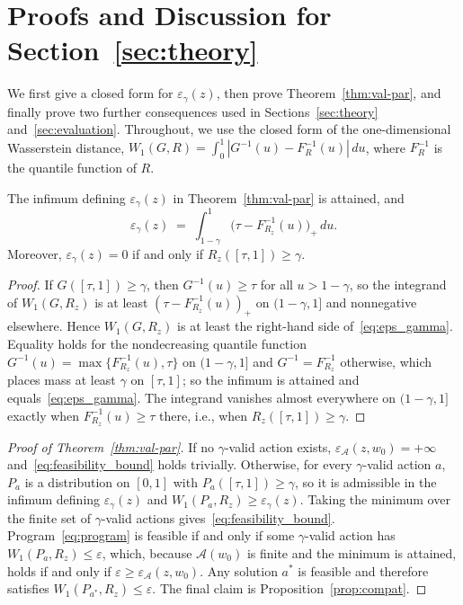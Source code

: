 \section{Proofs and Discussion for Section~\ref{sec:theory}}
\label{app:theory}

We first give a closed form for $\varepsilon_\gamma(z)$, then prove
Theorem~\ref{thm:val-par}, and finally prove two further consequences used in
Sections~\ref{sec:theory} and~\ref{sec:evaluation}. Throughout, we use the
closed form of the one-dimensional Wasserstein distance,
$W_1(G,R)=\int_0^1|G^{-1}(u)-F_R^{-1}(u)|\,du$, where $F_R^{-1}$ is the quantile
function of $R$.

\begin{proposition}
\label{prop:compat}
The infimum defining $\varepsilon_\gamma(z)$ in Theorem~\ref{thm:val-par} is
attained, and
\begin{equation}
  \varepsilon_\gamma(z)\;=\;\int_{1-\gamma}^{1}
      \bigl(\tau-F_{R_z}^{-1}(u)\bigr)_+\,du .
  \label{eq:eps_gamma}
\end{equation}
Moreover, $\varepsilon_\gamma(z)=0$ if and only if $R_z([\tau,1])\ge\gamma$.
\end{proposition}

\begin{proof}
If $G([\tau,1])\ge\gamma$, then $G^{-1}(u)\ge\tau$ for all $u>1-\gamma$, so the
integrand of $W_1(G,R_z)$ is at least $(\tau-F_{R_z}^{-1}(u))_+$ on
$(1-\gamma,1]$ and nonnegative elsewhere. Hence $W_1(G,R_z)$ is at least the
right-hand side of~\eqref{eq:eps_gamma}. Equality holds for the nondecreasing
quantile function $G^{-1}(u)=\max\{F_{R_z}^{-1}(u),\tau\}$ on $(1-\gamma,1]$ and
$G^{-1}=F_{R_z}^{-1}$ otherwise, which places mass at least $\gamma$ on
$[\tau,1]$; so the infimum is attained and equals~\eqref{eq:eps_gamma}. The
integrand vanishes almost everywhere on $(1-\gamma,1]$ exactly when
$F_{R_z}^{-1}(u)\ge\tau$ there, i.e., when $R_z([\tau,1])\ge\gamma$.
\end{proof}

\begin{proof}[Proof of Theorem~\ref{thm:val-par}]
If no $\gamma$-valid action exists, $\varepsilon_{\mathcal A}(z,w_0)=+\infty$
and~\eqref{eq:feasibility_bound} holds trivially. Otherwise, for every
$\gamma$-valid action $a$, $P_a$ is a distribution on $[0,1]$ with
$P_a([\tau,1])\ge\gamma$, so it is admissible in the infimum defining
$\varepsilon_\gamma(z)$ and $W_1(P_a,R_z)\ge\varepsilon_\gamma(z)$. Taking the
minimum over the finite set of $\gamma$-valid actions
gives~\eqref{eq:feasibility_bound}. Program~\eqref{eq:program} is feasible if
and only if some $\gamma$-valid action has $W_1(P_a,R_z)\le\varepsilon$, which,
because $\mathcal A(w_0)$ is finite and the minimum is attained, holds if and
only if $\varepsilon\ge\varepsilon_{\mathcal A}(z,w_0)$. Any solution $a^*$ is
feasible and therefore satisfies $W_1(P_{a^*},R_z)\le\varepsilon$. The final
claim is Proposition~\ref{prop:compat}.
\end{proof}

